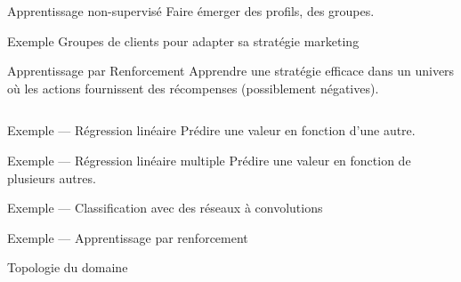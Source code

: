 \begin{frame}{Apprentissage non-supervisé}
  Faire émerger des profils, des groupes.
  \vfill
  \begin{exampleblock}{Exemple}
    Groupes de clients pour adapter sa stratégie marketing
  \end{exampleblock}
\end{frame}

\begin{frame}{Apprentissage par Renforcement}
  Apprendre une stratégie efficace dans un univers où les actions fournissent des récompenses (possiblement négatives).
  \vfill
  \begin{columns}[T]
    \begin{column}{0.5\textwidth}
    \end{column}
    \begin{column}{0.5\textwidth}
    \end{column}
  \end{columns}
\end{frame}

\begin{frame}{Exemple --- Régression linéaire}
  Prédire une valeur en fonction d'une autre.

\end{frame}

\begin{frame}{Exemple --- Régression linéaire multiple}
  Prédire une valeur en fonction de plusieurs autres.

\end{frame}

\begin{frame}{Exemple --- Classification avec des réseaux à convolutions}
\end{frame}

\begin{frame}{Exemple --- Apprentissage par renforcement}
\end{frame}

\begin{frame}{Topologie du domaine}
\end{frame}

